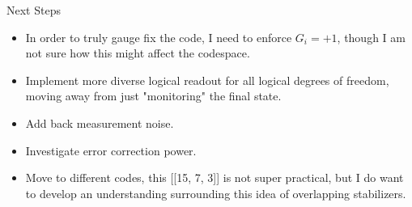 \documentclass{beamer}
\begin{document}
\begin{frame}{Next Steps}
    \begin{itemize}
        \item In order to truly gauge fix the code, I need to enforce $G_i = +1$, though I am not sure how this might affect the codespace.
        \item Implement more diverse logical readout for all logical degrees of freedom, moving away from just "monitoring" the final state.
        \item Add back measurement noise.
        \item Investigate error correction power.
        \item Move to different codes, this [[15, 7, 3]] is not super practical, but I do want to develop an understanding surrounding this idea of overlapping stabilizers.
    \end{itemize}
\end{frame}
\end{document}
